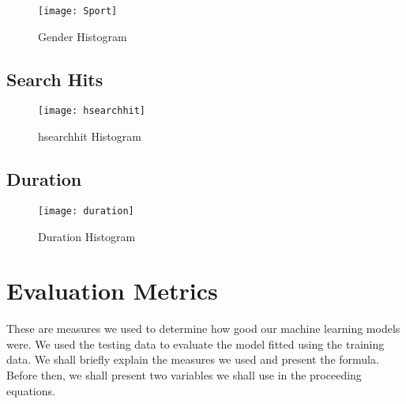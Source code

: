 \documentclass[
10pt, %
a4paper, %
oneside, %
headinclude,footinclude, %
BCOR5mm, %
]{scrartcl}
\begin{document}
\begin{figure}[H]
\centering 
\texttt{[image: Sport]} 
\caption[Lostic Regression Confusion Matrix]{Gender Histogram} %
\label{fig:gallery} 
\end{figure}
 
 \subsection{Search Hits}
 
 \begin{figure}[H]
\centering 
\texttt{[image: hsearchhit]} 
\caption[Lostic Regression Confusion Matrix]{ hsearchhit Histogram} %
\label{fig:gallery} 
\end{figure}

\subsection{Duration}
 \begin{figure}[H]
\centering 
\texttt{[image: duration]} 
\caption[Lostic Regression Confusion Matrix]{Duration Histogram} %
\label{fig:gallery} 
\end{figure}




\section{Evaluation Metrics}

These are measures we used to determine how good our machine learning models were. We used the testing data to evaluate the model fitted using the training data. We shall briefly explain the measures we used and present the formula. Before then, we shall present two variables we shall use in the proceeding equations. 
\end{document}
